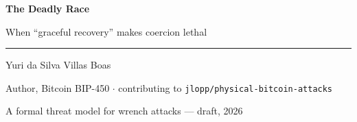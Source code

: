 \documentclass[aspectratio=169,12pt]{beamer}
\begin{document}
{
\begin{frame}[plain]
  \vspace{0.66em}
  {\color{accentdark}\huge\bfseries The Deadly Race\par}
  \vspace{0.28em}
  {\color{darktext}\large When ``graceful recovery'' makes coercion lethal\par}
  \vspace{0.88em}
  {\color{graytext}\rule{0.32\textwidth}{0.8pt}\par}
  \vspace{0.55em}
  {\large Yuri da Silva Villas Boas\par}
  \vspace{0.22em}
  {\color{graytext}\small
   Author, Bitcoin BIP-450 \quad$\cdot$\quad
   contributing to \texttt{jlopp/physical-bitcoin-attacks}\par}
  \vspace{0.77em}
  {\color{graytext}\footnotesize A formal threat model for wrench attacks --- draft, 2026\par}
\end{frame}}
\end{document}
